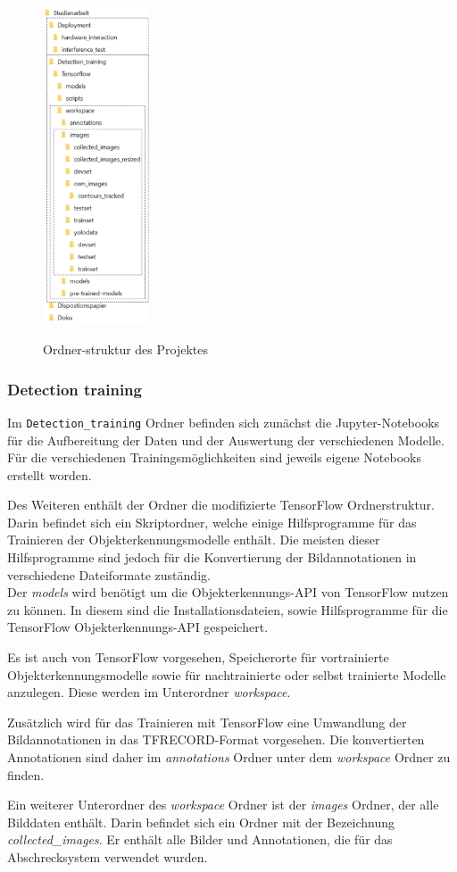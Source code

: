 {
\begin{figure}
    \centering
    \includegraphics[width=0.28\textwidth]{images/ordner_struktur_with_lines.pdf}
    \label{fig:ordnerstruktur}
    \caption{Ordner-struktur des Projektes}
\end{figure}

\subsubsection{Detection training}

Im \verb|Detection_training| Ordner befinden sich zunächst die Jupyter-Notebooks für die Aufbereitung der Daten und der Auswertung der verschiedenen Modelle. Für die verschiedenen Trainingsmöglichkeiten sind jeweils eigene Notebooks erstellt worden.


Des Weiteren enthält der Ordner die modifizierte TensorFlow Ordnerstruktur. Darin befindet sich ein Skriptordner, welche einige Hilfsprogramme für das Trainieren der Objekterkennungsmodelle enthält. Die meisten dieser Hilfsprogramme sind jedoch für die Konvertierung der Bildannotationen in verschiedene Dateiformate zuständig.
\\
Der \textit{models} wird benötigt um die Objekterkennungs-API von TensorFlow nutzen zu können. In diesem sind die Installationsdateien, sowie Hilfsprogramme für die TensorFlow Objekterkennungs-API gespeichert.

Es ist auch von TensorFlow vorgesehen, Speicherorte für vortrainierte Objekterkennungsmodelle sowie für nachtrainierte oder selbst trainierte Modelle anzulegen. Diese werden im Unterordner \textit{workspace}.

Zusätzlich wird für das Trainieren mit TensorFlow eine Umwandlung der Bildannotationen in das TFRECORD-Format vorgesehen. Die konvertierten  Annotationen sind daher im \textit{annotations} Ordner unter dem \textit{workspace} Ordner zu finden.

}
Ein weiterer Unterordner des \textit{workspace} Ordner ist der \textit{images} Ordner, der alle Bilddaten enthält. Darin befindet sich ein Ordner mit der Bezeichnung \textit{collected\_images}. Er enthält alle Bilder und Annotationen, die für das Abschrecksystem verwendet wurden.



